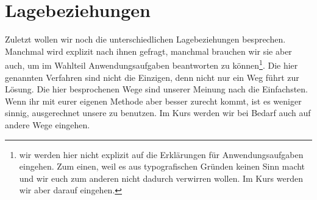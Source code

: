 \section{Lagebeziehungen}
	Zuletzt wollen wir noch die unterschiedlichen Lagebeziehungen besprechen.
	Manchmal wird explizit nach ihnen gefragt, manchmal brauchen wir sie aber auch,
	um im Wahlteil Anwendungsaufgaben beantworten zu können\footnote{wir werden
	hier nicht explizit auf die Erklärungen für Anwendungsaufgaben eingehen. Zum
	einen, weil es aus typografischen Gründen keinen Sinn macht und wir euch zum
	anderen nicht dadurch verwirren wollen. Im Kurs werden wir aber darauf
	eingehen.}. Die hier genannten Verfahren sind nicht die Einzigen, denn nicht
	nur ein Weg führt zur Lösung. Die hier besprochenen Wege sind unserer Meinung
	nach die Einfachsten. Wenn ihr mit eurer eigenen Methode aber besser zurecht
	kommt, ist es weniger sinnig, ausgerechnet unsere zu benutzen. Im Kurs werden
	wir bei Bedarf auch auf andere Wege eingehen.

	

	

	

	

	

	